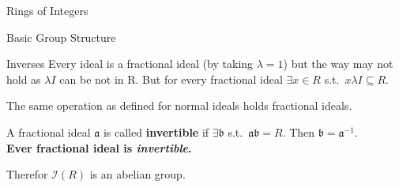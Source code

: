 \documentclass[12pt, letterpaper]{article}
\newcommand{\id}[1]{\mathfrak{#1}}
\begin{document}
\begin{section}{Rings of Integers}
\begin{subsection}{Basic Group Structure}
\begin{subsubsection}{Inverses}
      Every ideal is a fractional ideal (by taking \(\lambda = 1\)) but the
      way may not hold as \(\lambda I\) can be not in R. But for every
      fractional ideal \(\exists x \in R\) s.t.\ \(x \lambda I \subseteq R\).

      The same operation as defined for normal ideals holds fractional ideals.

      A fractional ideal \(\id{a}\) is called \textbf{invertible} if \(\exists
      \id{b}\) s.t.\ \(\id{a} \id{b} = R\). Then \(\id{b} = \id{a}^{-1}\). \\
      \textbf{Ever fractional ideal is \emph{invertible}.}

      Therefor \(\mathcal{I}(R)\) is an abelian group.

    \end{subsubsection}

  \end{subsection}

\end{section}

\newpage
\end{document}
